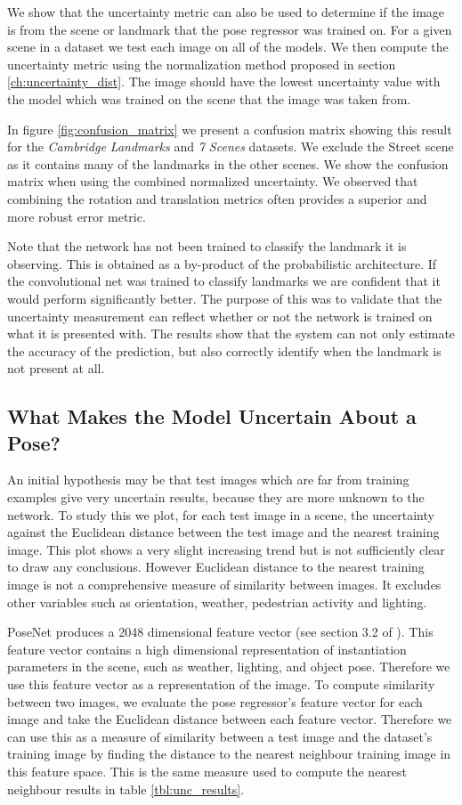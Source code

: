 We show that the uncertainty metric can also be used to determine if the image is from the scene or landmark that the pose regressor was trained on. For a given scene in a dataset we test each image on all of the models. We then compute the uncertainty metric using the normalization method proposed in section \ref{ch:uncertainty_dist}. The image should have the lowest uncertainty value with the model which was trained on the scene that the image was taken from.

In figure \ref{fig:confusion_matrix} we present a confusion matrix showing this result for the \textit{Cambridge Landmarks} and \textit{7 Scenes} datasets. We exclude the Street scene as it contains many of the landmarks in the other scenes. We show the confusion matrix when using the combined normalized uncertainty. We observed that combining the rotation and translation metrics often provides a superior and more robust error metric.

Note that the network has not been trained to classify the landmark it is observing. This is obtained as a by-product of the probabilistic architecture. If the convolutional net was trained to classify landmarks we are confident that it would perform significantly better. The purpose of this was to validate that the uncertainty measurement can reflect whether or not the network is trained on what it is presented with. The results show that the system can not only estimate the accuracy of the prediction, but also correctly identify when the landmark is not present at all.

\subsection{What Makes the Model Uncertain About a Pose?}

An initial hypothesis may be that test images which are far from training examples give very uncertain results, because they are more unknown to the network. To study this we plot, for each test image in a scene, the uncertainty against the Euclidean distance between the test image and the nearest training image. This plot shows a very slight increasing trend but is not sufficiently clear to draw any conclusions. However Euclidean distance to the nearest training image is not a comprehensive measure of similarity between images. It excludes other variables such as orientation, weather, pedestrian activity and lighting. 

PoseNet produces a 2048 dimensional feature vector (see section 3.2 of \citep{kendall2015posenet}). This feature vector contains a high dimensional representation of instantiation parameters in the scene, such as weather, lighting, and object pose. Therefore we use this feature vector as a representation of the image. To compute similarity between two images, we evaluate the pose regressor's feature vector for each image and take the Euclidean distance between each feature vector. Therefore we can use this as a measure of similarity between a test image and the dataset's training image by finding the distance to the nearest neighbour training image in this feature space. This is the same measure used to compute the nearest neighbour results in table \ref{tbl:unc_results}.

